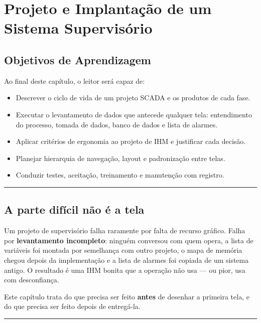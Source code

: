\chapter{Projeto e Implantação de um Sistema Supervisório}\label{projeto-e-implantauxe7uxe3o-de-um-sistema-supervisuxf3rio}

\section*{Objetivos de Aprendizagem}

Ao final deste capítulo, o leitor será capaz de:

\begin{itemize}
\tightlist
\item
  Descrever o ciclo de vida de um projeto SCADA e os produtos de cada fase.
\item
  Executar o levantamento de dados que antecede qualquer tela: entendimento do processo, tomada de dados, banco de dados e lista de alarmes.
\item
  Aplicar critérios de ergonomia ao projeto de IHM e justificar cada decisão.
\item
  Planejar hierarquia de navegação, layout e padronização entre telas.
\item
  Conduzir testes, aceitação, treinamento e manutenção com registro.
\end{itemize}

\begin{center}\rule{0.5\linewidth}{0.5pt}\end{center}

\section{A parte difícil não é a tela}\label{a-parte-difuxedcil-nuxe3o-uxe9-a-tela}

Um projeto de supervisório falha raramente por falta de recurso gráfico. Falha por \textbf{levantamento
incompleto}: ninguém conversou com quem opera, a lista de variáveis foi montada por semelhança com
outro projeto, o mapa de memória chegou depois da implementação e a lista de alarmes foi copiada de
um sistema antigo. O resultado é uma IHM bonita que a operação não usa --- ou pior, usa com desconfiança.

Este capítulo trata do que precisa ser feito \textbf{antes} de desenhar a primeira tela, e do que precisa
ser feito depois de entregá-la.

\begin{center}\rule{0.5\linewidth}{0.5pt}\end{center}

